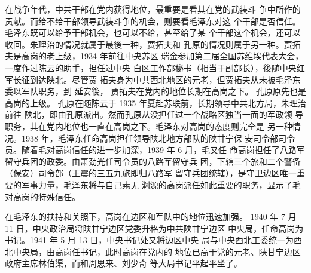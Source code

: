 在战争年代，中共干部在党内获得地位，最重要是看其在党的武装斗
争中所作的贡献。而给不给干部领导武装斗争的机会，则要看毛泽东对这
个干部是否信任。毛泽东既可以给予干部机会，也可以不给，甚至给了某
个干部这个机会，还可以收回。朱理治的情况就属于最後一种，贾拓夫和
孔原的情况则属于另一种。贾拓夫是高岗的老上级，1934 年前往中央苏区
瑞金参加第二届全国苏维埃代表大会，一度作过陈云的助手，担任过中央
白区工作部秘书（相当于副部长），後随中央红军长征到达陕北。尽管贾
拓夫身为中共西北地区的元老，但贾拓夫从未被毛泽东委以军队职务，到
延安後，
贾拓夫在党内的地位长期在高岗之下。
孔原原先也是高岗的上级。
孔原在随陈云于 1935 年夏赴苏联前，长期领导中共北方局，朱理治前往
陕北，即由孔原派出。然而孔原从没担任过一个战略区独当一面的军政领
导职务，其在党内地位也一直在高岗之下。毛泽东对高岗的态度则完全是
另一种情况。1938 年，毛泽东任命高岗担任领导陕北地方部队的陕甘宁保
安司令部司令员。随着毛对高岗信任的进一步加深，1939 年 6 月，毛又任
命高岗担任了八路军留守兵团的政委。由萧劲光任司令员的八路军留守兵
团，下辖三个旅和二个警备（保安）司令部（王震的三五九旅即归八路军
留守兵团统辖），是守卫边区唯一重要的军事力量，毛泽东将与自己素无
渊源的高岗派任如此重要的职务，显示了毛对高岗的特殊信任。

在毛泽东的扶持和关照下，高岗在边区和军队中的地位迅速加强。
1940 年 7 月 11 日，中央政治局将陕甘宁边区党委升格为中共陕甘宁边区
中央局，任命高岗为书记。1941 年 5 月 13 日，中央书记处又将边区中央
局与中央西北工委统一为西北中央局，由高岗任书记，此时高岗在党内的
地位已高于党的元老、陕甘宁边区政府主席林伯渠，而和周恩来、刘少奇
等大局书记平起平坐了。

